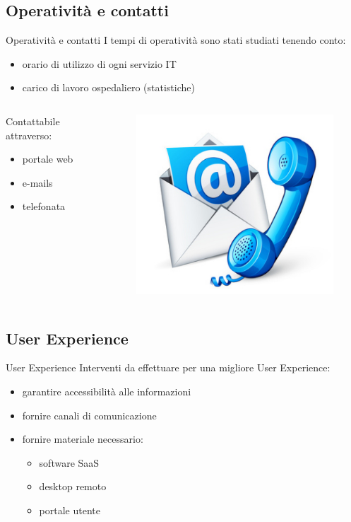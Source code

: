 \subsection*{Operatività e contatti}
\begin{frame}{Operatività e contatti}
I tempi di operatività sono stati studiati tenendo conto:
\begin{itemize}
\item{orario di utilizzo di ogni servizio IT}
\item{carico di lavoro ospedaliero (statistiche)}
\end{itemize}
\begin{columns}
\begin{column}{0.7\textwidth}
Contattabile attraverso:
\begin{itemize}
\item{portale web}
\item{e-mails}
\item{telefonata}
\end{itemize}
\end{column}
\begin{column}{0.3\textwidth}
\begin{figure}
\includegraphics[scale=0.2]{Images/Contact.png}
\end{figure}
\end{column}
\end{columns}
\end{frame}

\subsection*{User Experience}
\begin{frame}{User Experience}
Interventi da effettuare per una migliore User Experience:
\begin{itemize}
\item{garantire accessibilità alle informazioni}
\item{fornire canali di comunicazione}
\item{fornire materiale necessario:}
\begin{itemize}
\item{software SaaS}
\item{desktop remoto}
\item{portale utente}
\end{itemize}
\end{itemize}
\end{frame}

